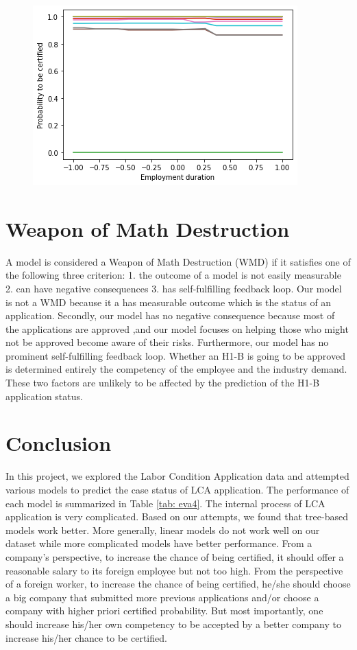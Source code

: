 \documentclass{article}
\begin{document}
\begin{figure}[H]
\begin{minipage}{.31\textwidth}
        \includegraphics[width = \textwidth]{figures/employment_duration.png}
        \label{fig:employment_duration}
    \end{minipage}
\end{figure}
\section{Weapon of Math Destruction \cite{o2016weapons}}
A model is considered a Weapon of Math Destruction (WMD) if it satisfies one of the following three criterion: 1. the outcome of a model is not easily measurable 2. can have negative consequences 3. has self-fulfilling feedback loop. Our model is not a WMD because it a has measurable outcome which is the status of an application. Secondly, our model has no negative consequence because most of the applications are approved ,and our model focuses on helping those who might not be approved become aware of their risks. Furthermore, our model has no prominent self-fulfilling feedback loop. Whether an H1-B is going to be approved is determined entirely the competency of the employee and the industry demand. These two factors are unlikely to be affected by the prediction of the H1-B application status.  
\section{Conclusion}
In this project, we explored the Labor Condition Application data and attempted various models to predict the case status of LCA application. The performance of each model is summarized in Table \ref{tab: eva4}. The internal process of LCA application is very complicated. Based on our attempts, we found that tree-based models work better. More generally, linear models do not work well on our dataset while more complicated models have better performance. From a company's perspective, to increase the chance of being certified, it should offer a reasonable salary to its foreign employee but not too high. From the perspective of a foreign worker, to increase the chance of being certified, he/she should choose a big company that submitted more previous applications and/or choose a company with higher priori certified probability. But most importantly, one should increase his/her own competency to be accepted by a better company to increase his/her chance to be certified. 
\end{document}
